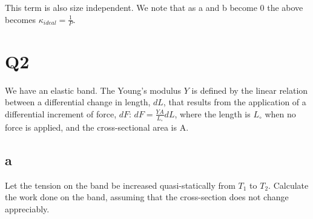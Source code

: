\documentclass[10pt,a4paper]{article}
\begin{document}
This term is also size independent.  We note that as a and b become 0 the above becomes $\kappa_{ideal} =\frac{1}{P}$.
\section{Q2}
We have an elastic band. The Young’s modulus $Y$ is defined by the linear relation
between a differential change in length, $dL$, that results from the application of a
differential increment of force, $dF$: $dF =\frac{YA}{L_\circ}dL$, where the length is $L_\circ$ when no
force is applied, and the cross-sectional area is A.
\subsection{a}
Let the tension on the band be increased quasi-statically from $T_1$ to $T_2$. Calculate
the work done on the band, assuming that the cross-section does not change
appreciably.\\
\end{document}
